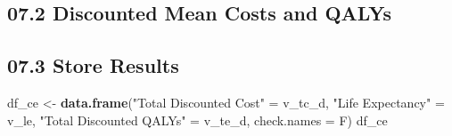 \documentclass[
]{article}
\newenvironment{Shaded}{\begin{snugshade}}{\end{snugshade}}
\newcommand{\CommentTok}[1]{\textcolor[rgb]{0.56,0.35,0.01}{\textit{#1}}}
\newcommand{\DataTypeTok}[1]{\textcolor[rgb]{0.13,0.29,0.53}{#1}}
\newcommand{\KeywordTok}[1]{\textcolor[rgb]{0.13,0.29,0.53}{\textbf{#1}}}
\newcommand{\NormalTok}[1]{#1}
\newcommand{\OperatorTok}[1]{\textcolor[rgb]{0.81,0.36,0.00}{\textbf{#1}}}
\newcommand{\StringTok}[1]{\textcolor[rgb]{0.31,0.60,0.02}{#1}}
\begin{document}
\hypertarget{discounted-mean-costs-and-qalys}{%
\subsection{07.2 Discounted Mean Costs and
QALYs}\label{discounted-mean-costs-and-qalys}}

\begin{Shaded}
\end{Shaded}

\hypertarget{store-results}{%
\subsection{07.3 Store Results}\label{store-results}}

\begin{Shaded}
\begin{Highlighting}[]
\NormalTok{df_ce <-}\StringTok{ }\KeywordTok{data.frame}\NormalTok{(}\StringTok{"Total Discounted Cost"}\NormalTok{  =}\StringTok{ }\NormalTok{v_tc_d, }
                    \StringTok{"Life Expectancy"}\NormalTok{        =}\StringTok{ }\NormalTok{v_le, }
                    \StringTok{"Total Discounted QALYs"}\NormalTok{ =}\StringTok{ }\NormalTok{v_te_d, }
                    \DataTypeTok{check.names =}\NormalTok{ F)}
\NormalTok{df_ce}
\end{Highlighting}
\end{Shaded}
\end{document}
